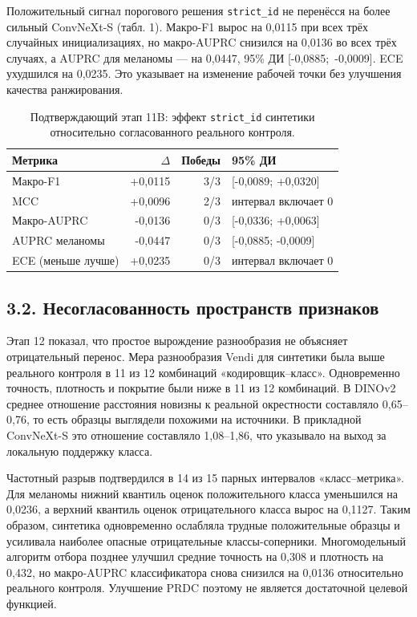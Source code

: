 \documentclass[12pt,a4paper]{article}
\newcommand{\ci}[2]{[#1;~#2]}
\begin{document}
Положительный сигнал порогового решения \texttt{strict\_id} не перенёсся на более сильный ConvNeXt-S (табл. 1). Макро-F1 вырос на 0,0115 при всех трёх случайных инициализациях, но макро-AUPRC снизился на 0,0136 во всех трёх случаях, а AUPRC для меланомы --- на 0,0447, 95\% ДИ \ci{-0,0885}{-0,0009}. ECE ухудшился на 0,0235. Это указывает на изменение рабочей точки без улучшения качества ранжирования.

\begin{table}[ht]
\centering
\caption{Подтверждающий этап 11B: эффект \texttt{strict\_id} синтетики относительно согласованного реального контроля.}
\begin{tabular}{lrrl}
\toprule
Метрика & $\Delta$ & Победы & 95\% ДИ \\
\midrule
Макро-F1 & +0,0115 & 3/3 & [-0,0089; +0,0320] \\
MCC & +0,0096 & 2/3 & интервал включает 0 \\
Макро-AUPRC & -0,0136 & 0/3 & [-0,0336; +0,0063] \\
AUPRC меланомы & -0,0447 & 0/3 & [-0,0885; -0,0009] \\
ECE (меньше лучше) & +0,0235 & 0/3 & интервал включает 0 \\
\bottomrule
\end{tabular}
\end{table}

\subsection*{3.2. Несогласованность пространств признаков}

Этап 12 показал, что простое вырождение разнообразия не объясняет отрицательный перенос. Мера разнообразия Vendi для синтетики была выше реального контроля в 11 из 12 комбинаций «кодировщик--класс». Одновременно точность, плотность и покрытие были ниже в 11 из 12 комбинаций. В DINOv2 среднее отношение расстояния новизны к реальной окрестности составляло 0,65--0,76, то есть образцы выглядели похожими на источники. В прикладной ConvNeXt-S это отношение составляло 1,08--1,86, что указывало на выход за локальную поддержку класса.

Частотный разрыв подтвердился в 14 из 15 парных интервалов «класс--метрика». Для меланомы нижний квантиль оценок положительного класса уменьшился на 0,0236, а верхний квантиль оценок отрицательного класса вырос на 0,1127. Таким образом, синтетика одновременно ослабляла трудные положительные образцы и усиливала наиболее опасные отрицательные классы-соперники. Многомодельный алгоритм отбора позднее улучшил средние точность на 0,308 и плотность на 0,432, но макро-AUPRC классификатора снова снизился на 0,0136 относительно реального контроля. Улучшение PRDC поэтому не является достаточной целевой функцией.
\end{document}
